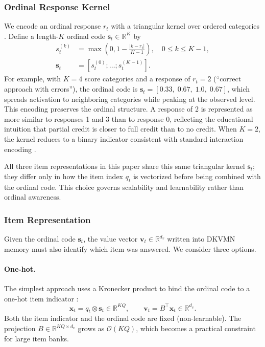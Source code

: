 \documentclass[pdflatex,sn-apa]{sn-jnl}
\begin{document}
\subsubsection{Ordinal Response Kernel}
We encode an ordinal response $r_t$ with a triangular kernel over ordered categories \citep{vargas_soft_2023}.
Define a length-$K$ ordinal code $\mathbf{s}_t \in \mathbb{R}^{K}$ by
\begin{equation}\label{eqn:linear_embed}
    \begin{split}
    s_t^{(k)}&=\max\!\left(0,1-\frac{|k-r_t|}{K-1}\right),\quad 0\le k\le K-1,\\
    \mathbf{s}_t&=[s_t^{(0)};\ldots;s_t^{(K-1)}].
    \end{split}
\end{equation}
For example, with $K=4$ score categories and a response of $r_t = 2$ (``correct approach with errors''), the ordinal code is $\mathbf{s}_t = [0.33,\; 0.67,\; 1.0,\; 0.67]$, which spreads activation to neighboring categories while peaking at the observed level. This encoding preserves the ordinal structure. A response of 2 is represented as more similar to responses 1 and 3 than to response 0, reflecting the educational intuition that partial credit is closer to full credit than to no credit. When $K=2$, the kernel reduces to a binary indicator consistent with standard interaction encoding \citep{zhang_dynamic_2017}.

All three item representations in this paper share this same triangular kernel $\mathbf{s}_t$; they differ only in how the item index $q_t$ is vectorized before being combined with the ordinal code. This choice governs scalability and learnability rather than ordinal awareness.

\subsubsection{Item Representation}
\label{sec:item_identity}
Given the ordinal code $\mathbf{s}_t$, the value vector $\mathbf{v}_t \in \mathbb{R}^{d_v}$ written into DKVMN memory must also identify which item was answered. We consider three options.

\paragraph{One-hot.} The simplest approach uses a Kronecker product to bind the ordinal code to a one-hot item indicator \citep{piech_deep_2015, zhang_dynamic_2017}:
\begin{equation}
    \mathbf{x}_t = q_t \otimes \mathbf{s}_t \in \mathbb{R}^{KQ}, \qquad \mathbf{v}_t = B^{\top}\mathbf{x}_t \in \mathbb{R}^{d_v}.
\end{equation}
Both the item indicator and the ordinal code are fixed (non-learnable). The projection $B \in \mathbb{R}^{KQ \times d_v}$ grows as $\mathcal{O}(KQ)$, which becomes a practical constraint for large item banks.
\end{document}
